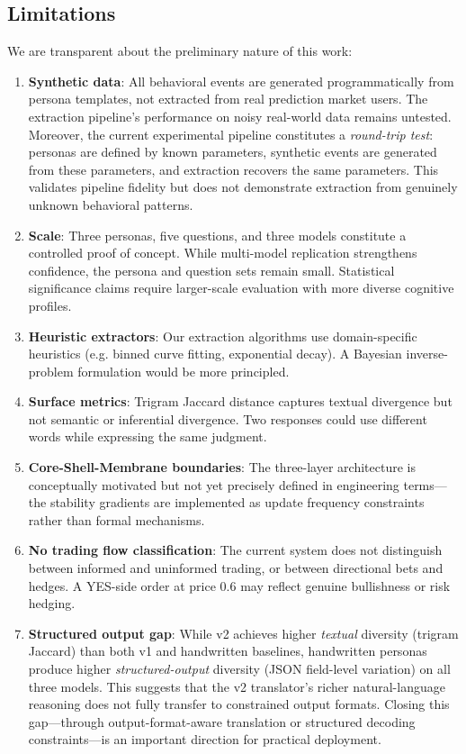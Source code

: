 \documentclass[11pt]{article}
\newcommand{\eg}{e.g.}
\begin{document}
\subsection{Limitations}

We are transparent about the preliminary nature of this work:

\begin{enumerate}[leftmargin=*,itemsep=1pt]
    \item \textbf{Synthetic data}: All behavioral events are generated programmatically from persona templates, not extracted from real prediction market users. The extraction pipeline's performance on noisy real-world data remains untested. Moreover, the current experimental pipeline constitutes a \emph{round-trip test}: personas are defined by known parameters, synthetic events are generated from these parameters, and extraction recovers the same parameters. This validates pipeline fidelity but does not demonstrate extraction from genuinely unknown behavioral patterns.
    \item \textbf{Scale}: Three personas, five questions, and three models constitute a controlled proof of concept. While multi-model replication strengthens confidence, the persona and question sets remain small. Statistical significance claims require larger-scale evaluation with more diverse cognitive profiles.
    \item \textbf{Heuristic extractors}: Our extraction algorithms use domain-specific heuristics (\eg{} binned curve fitting, exponential decay). A Bayesian inverse-problem formulation would be more principled.
    \item \textbf{Surface metrics}: Trigram Jaccard distance captures textual divergence but not semantic or inferential divergence. Two responses could use different words while expressing the same judgment.
    \item \textbf{Core-Shell-Membrane boundaries}: The three-layer architecture is conceptually motivated but not yet precisely defined in engineering terms---the stability gradients are implemented as update frequency constraints rather than formal mechanisms.
    \item \textbf{No trading flow classification}: The current system does not distinguish between informed and uninformed trading, or between directional bets and hedges. A YES-side order at price 0.6 may reflect genuine bullishness or risk hedging.
    \item \textbf{Structured output gap}: While v2 achieves higher \emph{textual} diversity (trigram Jaccard) than both v1 and handwritten baselines, handwritten personas produce higher \emph{structured-output} diversity (JSON field-level variation) on all three models. This suggests that the v2 translator's richer natural-language reasoning does not fully transfer to constrained output formats. Closing this gap---through output-format-aware translation or structured decoding constraints---is an important direction for practical deployment.

\end{enumerate}
\end{document}
